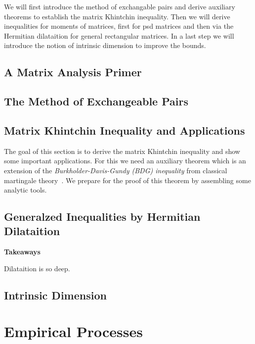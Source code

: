 \documentclass[11pt, a4paper, BCOR=10mm, DIV=9]{scrbook}
\newenvironment{takeaways}
  {
   \begin{lrbox}{\selvestebox}%
   \begin{minipage}{12.4cm}
     \textbf{Takeaways}
   }
  {\end{minipage}\end{lrbox}%
   \begin{center}
\setlength\fboxsep{.5cm}
   \colorbox[HTML]{F8E0E0}{\usebox{\selvestebox}}
   \end{center}}
\theoremstyle{definition}
\theoremstyle{plain}
\begin{document}
  We will first introduce the method of exchangable pairs and derive auxiliary theorems to establish the matrix Khintchin inequality.
  Then we will derive inequalities for moments of matrices, first for psd matrices and then via the Hermitian dilataition for general rectangular matrices. In a last step we will introduce the notion of intrinsic dimension to improve the bounds.

  \section{A Matrix Analysis Primer}
  
  \section{The Method of Exchangeable Pairs}
  
 \section{Matrix Khintchin Inequality and Applications}
 The goal of this section is to derive the matrix Khintchin inequality and show some important applications.
 For this we need an auxiliary theorem which is an extension of the 
 \textit{Burkholder-Davis-Gundy (BDG) inequality} from classical martingale theory~\cite{Burkholder1973}.
  We prepare for the proof of this theorem by assembling some analytic tools.
  
  \section{Generalzed Inequalities by Hermitian Dilataition}
  
  
  \begin{takeaways}
    Dilataition is so deep.
    \lipsum[3]
  \end{takeaways}
  
  \newpage
  \section{Intrinsic Dimension}
  


\chapter{Empirical Processes}
\end{document}
